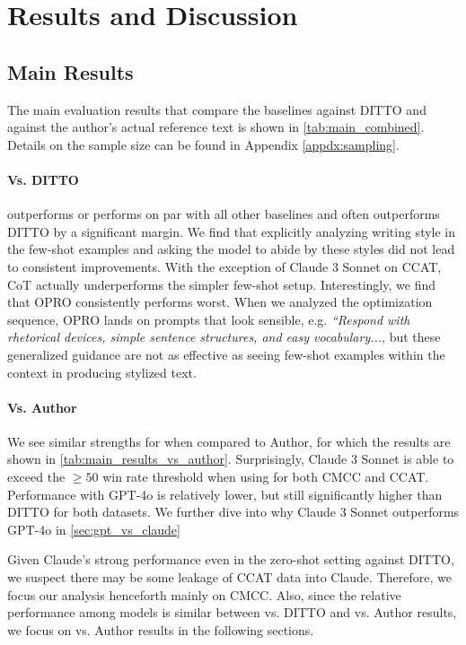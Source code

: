 

\section{Results and Discussion}
\label{sec:results}
\subsection{Main Results}
\label{ssec:main_results}
The main evaluation results that compare the baselines against DITTO and against the author's actual reference text is shown in \autoref{tab:main_combined}.
Details on the sample size can be found in Appendix \ref{appdx:sampling}.

\paragraph{Vs. DITTO} \ours outperforms or performs on par with all other baselines and often outperforms DITTO by a significant margin. 
We find that explicitly analyzing writing style in the few-shot examples and asking the model to abide by these styles did not lead to consistent improvements. 
With the exception of Claude 3 Sonnet on CCAT, CoT actually underperforms the simpler few-shot setup.
Interestingly, we find that OPRO consistently performs worst. 
When we analyzed the optimization sequence, OPRO lands on prompts that look sensible, e.g. \textit{``Respond with rhetorical devices, simple sentence structures, and easy vocabulary...}, but these generalized guidance are not as effective as seeing few-shot examples within the context in producing stylized text.  

\paragraph{Vs. Author} We see similar strengths for \ours when compared to Author, for which the results are shown in \autoref{tab:main_results_vs_author}. 
Surprisingly, Claude 3 Sonnet is able to exceed the $\geq 50$ win rate threshold when using \ours for both CMCC and CCAT. 
Performance with GPT-4o is relatively lower, but still significantly higher than DITTO for both datasets. 
We further dive into why Claude 3 Sonnet outperforms GPT-4o in \textsection \ref{sec:gpt_vs_claude}

Given Claude's strong performance even in the zero-shot setting against DITTO, we suspect there may be some leakage of CCAT data into Claude.  
Therefore, we focus our analysis henceforth mainly on CMCC. 
Also, since the relative performance among models is similar between vs. DITTO and vs. Author results, we focus on vs. Author results in the following sections. 



